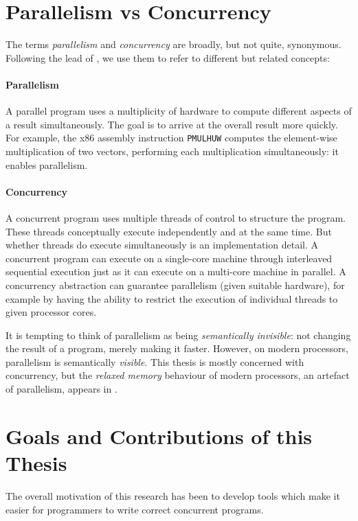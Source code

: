 \section{Parallelism vs Concurrency}
\label{sec:intro-parconc}

The terms \emph{parallelism} and \emph{concurrency} are broadly, but
not quite, synonymous.  Following the lead of \cite{peytonjones1996},
we use them to refer to different but related concepts:

\paragraph{Parallelism}
A parallel program uses a multiplicity of hardware to compute
different aspects of a result simultaneously.  The goal is to arrive
at the overall result more quickly.  For example, the x86 assembly
instruction \verb#PMULHUW# computes the element-wise multiplication of
two vectors, performing each multiplication simultaneously: it enables
parallelism.

\paragraph{Concurrency}
A concurrent program uses multiple threads of control to structure the
program.  These threads conceptually execute independently and at the
same time.  But whether threads do execute simultaneously is an
implementation detail.  A concurrent program can execute on a
single-core machine through interleaved sequential execution just as
it can execute on a multi-core machine in parallel.  A concurrency
abstraction can guarantee parallelism (given suitable hardware), for
example by having the ability to restrict the execution of individual
threads to given processor cores.

It is tempting to think of parallelism as being \emph{semantically
  invisible}: not changing the result of a program, merely making it
faster.  However, on modern processors, parallelism is semantically
\emph{visible}.  This thesis is mostly concerned with concurrency, but
the \emph{relaxed memory} behaviour of modern processors, an artefact
of parallelism, appears in .

\section{Goals and Contributions of this Thesis}
\label{sec:intro-contributions}

The overall motivation of this research has been to develop tools
which make it easier for programmers to write correct concurrent
programs.

